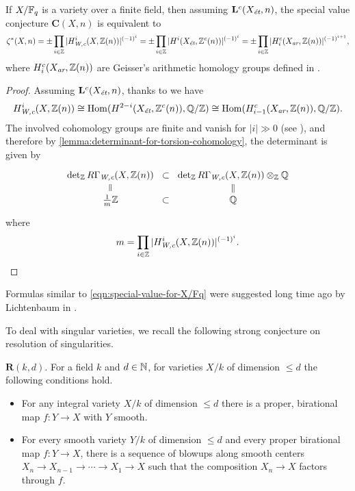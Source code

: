 \documentclass{article}
\numberwithin{equation}{section}
\begin{document}
\begin{proposition}
  \label{prop:C(X,n)-over-finite-fields}
  If $X/\FF_q$ is a variety over a finite field, then assuming
  $\mathbf{L}^c (X_\et,n)$, the special value conjecture
  $\mathbf{C} (X,n)$ is equivalent to
  \begin{equation}
    \label{eqn:special-value-for-X/Fq}
    \zeta^* (X,n) = \pm \prod_{i \in \ZZ} |H_\Wc^i (X, \ZZ(n))|^{(-1)^i}
    = \pm \prod_{i \in \ZZ} |H^i (X_\et, \ZZ^c (n))|^{(-1)^i}
    = \pm \prod_{i \in \ZZ} |H_i^c (X_\ar, \ZZ (n))|^{(-1)^{i+1}},
  \end{equation}
  where $H_i^c (X_\ar, \ZZ (n))$ are Geisser's arithmetic homology groups
  defined in \cite{Geisser-2010-arithmetic-homology}.

  \begin{proof}
    Assuming $\mathbf{L}^c (X_\et,n)$, thanks to
    \cite[Proposition~7.7]{Beshenov-Weil-etale-1} we have
    \[ H^i_\Wc (X, \ZZ (n)) \cong
      \Hom (H^{2-i} (X_\et, \ZZ^c (n)), \QQ/\ZZ) \cong
      \Hom (H_{i-1}^c (X_\ar, \ZZ (n)), \QQ/\ZZ). \]
    The involved cohomology groups are finite and vanish for $|i| \gg 0$
    (see \cite[Proposition~4.2]{Beshenov-Weil-etale-1}), and therefore by
    \ref{lemma:determinant-for-torsion-cohomology}, the determinant is given by
    \[ \begin{tikzcd}[row sep=0.75em, column sep=0pt]
        \det_\ZZ R\Gamma_\Wc (X, \ZZ (n)) \ar[equals]{d} & \subset & \det_\ZZ R\Gamma_\Wc (X, \ZZ (n)) \otimes_\ZZ \QQ \ar[equals]{d} \\
        \frac{1}{m}\ZZ & \subset & \QQ
      \end{tikzcd} \]
    where
    \[ m = \prod_{i \in \ZZ} |H_\Wc^i (X, \ZZ(n))|^{(-1)^i}. \qedhere \]
  \end{proof}
\end{proposition}

\begin{remark}
  Formulas similar to \eqref{eqn:special-value-for-X/Fq} were suggested long
  time ago by Lichtenbaum in \cite{Lichtenbaum-1984}.
\end{remark}

To deal with singular varieties, we recall the following strong conjecture on
resolution of singularities.

\begin{conjecture}
  $\mathbf{R} (k,d)$. For a field $k$ and $d \in \NN$, for varieties $X/k$ of
  dimension $\le d$ the following conditions hold.
  \begin{itemize}
  \item For any integral variety $X/k$ of dimension $\le d$ there is a proper,
    birational map $f\colon Y \to X$ with $Y$ smooth.

  \item For every smooth variety $Y/k$ of dimension $\le d$ and every proper
    birational map $f\colon Y\to X$, there is a sequence of blowups along smooth
    centers
    $X_n \to X_{n-1} \to \cdots \to X_1 \to X$
    such that the composition $X_n \to X$ factors through $f$.
  \end{itemize}
\end{conjecture}
\end{document}
